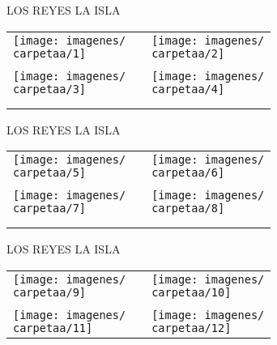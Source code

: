 \documentclass[10pt,letter]{report}
\begin{document}
\renewcommand{\carpetaa}{los_reyes_la_isla}

\begin{center}
	\textcolor{principal}{LOS REYES LA ISLA}
\end{center}
\begin{table}[H]
\centering

\footnotesize
	\begin{tabular}{m{7cm}m{1cm}m{7cm}}
	
	\texttt{[image: imagenes/\\carpetaa/1]}&&\texttt{[image: imagenes/\\carpetaa/2]}
	\\
	\\
	\texttt{[image: imagenes/\\carpetaa/3]}&&\texttt{[image: imagenes/\\carpetaa/4]}\\
	\\
	\\
	
	\end{tabular}
	
\end{table}
\newpage

\begin{center}
	\textcolor{principal}{LOS REYES LA ISLA}
\end{center}
\begin{table}[H]
\centering

\footnotesize
	\begin{tabular}{m{7cm}m{1cm}m{7cm}}
	
	\texttt{[image: imagenes/\\carpetaa/5]}&&\texttt{[image: imagenes/\\carpetaa/6]}
	\\
	\\
	\texttt{[image: imagenes/\\carpetaa/7]}&&\texttt{[image: imagenes/\\carpetaa/8]}\\
	\\
	\\
	
	\end{tabular}
	
\end{table}
\newpage

\begin{center}
	\textcolor{principal}{LOS REYES LA ISLA}
\end{center}
\begin{table}[H]
\centering

\footnotesize
	\begin{tabular}{m{7cm}m{1cm}m{7cm}}
	
	\texttt{[image: imagenes/\\carpetaa/9]}&&\texttt{[image: imagenes/\\carpetaa/10]}
	\\
	\\
		\texttt{[image: imagenes/\\carpetaa/11]}&&\texttt{[image: imagenes/\\carpetaa/12]}

	
	\end{tabular}
	
\end{table}
\newpage
\end{document}
